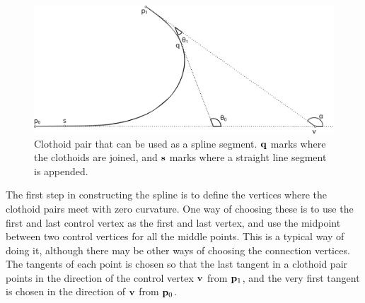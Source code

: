 \begin{figure}[ht]
\centering
\includegraphics[width=\textwidth]{figure/clothoid_pair}
\caption{Clothoid pair that can be used as a spline segment. $\mathbf{q}$ marks where the clothoids are joined, and $\mathbf{s}$ marks where a straight line segment is appended.}
\label{fig:clothoid_pair}
\end{figure}

The first step in constructing the spline is to define the vertices where the clothoid pairs meet with zero curvature. One way of choosing these is to use the first and last control vertex as the first and last vertex, and use the midpoint between two control vertices for all the middle points. This is a typical way of doing it, although there may be other ways of choosing the connection vertices. The tangents of each point is chosen so that the last tangent in a clothoid pair points in the direction of the control vertex $\mathbf{v}$ from $\mathbf{p}_1$, and the very first tangent is chosen in the direction of $\mathbf{v}$ from $\mathbf{p}_0$. 

